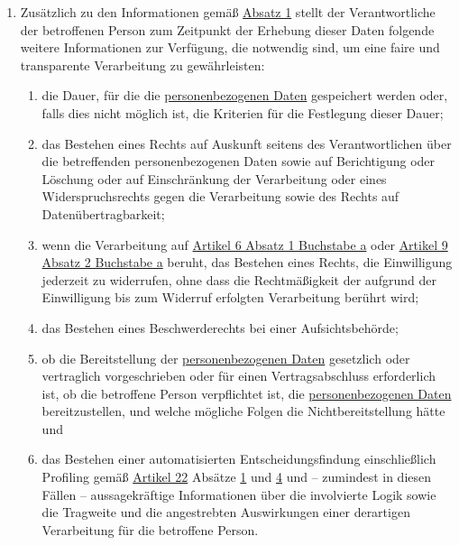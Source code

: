 \begin{enumerate}
\begin{enumerate}
  \end{enumerate}

  \item Zusätzlich zu den Informationen gemäß \hyperref[itm:13-1]{Absatz 1} stellt der Verantwortliche der betroffenen
   Person zum Zeitpunkt der Erhebung dieser Daten folgende weitere Informationen zur Verfügung, die notwendig sind, um
   eine faire und transparente Verarbeitung zu gewährleisten:
  \label{itm:13-2}

  \begin{enumerate}
  
    \item die Dauer, für die die \hyperref[itm:04-1]{personenbezogenen Daten} gespeichert werden oder, falls dies nicht möglich ist, die
     Kriterien für die Festlegung dieser Dauer;
    \label{itm:13-2a}

    \item das Bestehen eines Rechts auf Auskunft seitens des Verantwortlichen über die betreffenden personenbezogenen
     Daten sowie auf Berichtigung oder Löschung oder auf Einschränkung der Verarbeitung oder eines Widerspruchsrechts
     gegen die Verarbeitung sowie des Rechts auf Datenübertragbarkeit;
    \label{itm:13-2b}

    \item wenn die Verarbeitung auf \hyperref[itm:06-1a]{Artikel 6 Absatz 1 Buchstabe a} oder \hyperref[itm:09-2a]
     {Artikel 9 Absatz 2 Buchstabe a} beruht, das Bestehen eines Rechts, die Einwilligung jederzeit zu widerrufen, ohne
     dass die Rechtmäßigkeit der aufgrund der Einwilligung bis zum Widerruf erfolgten Verarbeitung berührt wird;
    \label{itm:13-2c}

    \item das Bestehen eines Beschwerderechts bei einer Aufsichtsbehörde;
    \label{itm:13-2d}

    \item ob die Bereitstellung der \hyperref[itm:04-1]{personenbezogenen Daten} gesetzlich oder vertraglich vorgeschrieben oder für einen
     Vertragsabschluss erforderlich ist, ob die betroffene Person verpflichtet ist, die \hyperref[itm:04-1]{personenbezogenen Daten}
     bereitzustellen, und welche mögliche Folgen die Nichtbereitstellung hätte und
    \label{itm:13-2e}

    \item das Bestehen einer automatisierten Entscheidungsfindung einschließlich Profiling gemäß \hyperref[ch:22]
     {Artikel 22} Absätze \hyperref[itm:22-1]{1} und \hyperref[itm:22-4]{4} und -- zumindest in diesen Fällen --
     aussagekräftige Informationen über die involvierte Logik sowie die Tragweite und die angestrebten Auswirkungen
     einer derartigen Verarbeitung für die betroffene Person.
    \label{itm:13-2f}


\end{enumerate}
\end{enumerate}
